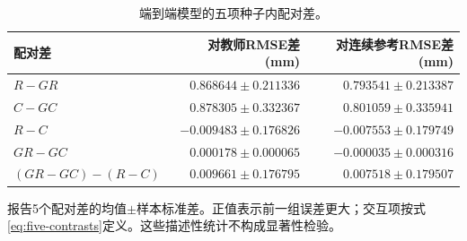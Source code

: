 \begin{table}[t]
\centering\small
\caption{端到端模型的五项种子内配对差。}
\label{tab:paired}
\begin{tabular}{lrr}
\toprule
配对差 & 对教师RMSE差 (mm) & 对连续参考RMSE差 (mm) \\
\midrule
$R-GR$ & $0.868644 \pm 0.211336$ & $0.793541 \pm 0.213387$ \\
$C-GC$ & $0.878305 \pm 0.332367$ & $0.801059 \pm 0.335941$ \\
$R-C$ & $-0.009483 \pm 0.176826$ & $-0.007553 \pm 0.179749$ \\
$GR-GC$ & $0.000178 \pm 0.000065$ & $-0.000035 \pm 0.000316$ \\
$(GR-GC)-(R-C)$ & $0.009661 \pm 0.176795$ & $0.007518 \pm 0.179507$ \\
\bottomrule
\end{tabular}
\par\smallskip\begin{minipage}{0.96\textwidth}\footnotesize 报告5个配对差的均值$\pm$样本标准差。正值表示前一组误差更大；交互项按式\eqref{eq:five-contrasts}定义。这些描述性统计不构成显著性检验。\end{minipage}
\end{table}
